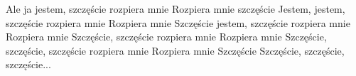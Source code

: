\documentclass[../../../songbook.tex]{subfiles}
\begin{document}
\-\hspace{1cm} Ale ja jestem, szczęście rozpiera mnie		 \newline
\-\hspace{1cm} Rozpiera mnie szczęście 				\newline
\-\hspace{1cm} Jestem, jestem, szczęście rozpiera mnie					\newline	
\-\hspace{1cm} Rozpiera mnie 				\newline
\-\hspace{1cm} Szczęście jestem, szczęście rozpiera mnie					\newline	
\-\hspace{1cm} Rozpiera mnie 				\newline
\-\hspace{1cm} Szczęście, szczęście rozpiera mnie					\newline		
\-\hspace{1cm} Rozpiera mnie 				\newline
\-\hspace{1cm} Szczęście, szczęście, szczęście rozpiera mnie					\newline	
\-\hspace{1cm} Rozpiera mnie 				\newline
\-\hspace{1cm} Szczęście Szczęście, szczęście, szczęście...					\newline	
\end{document}
